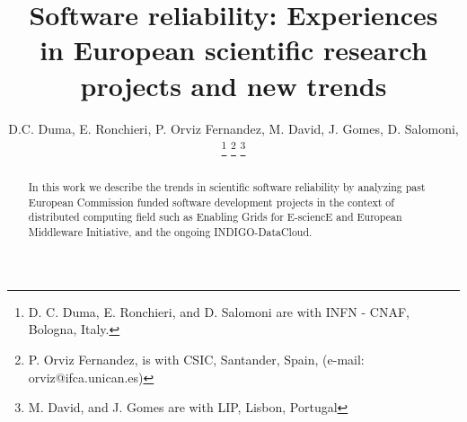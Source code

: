 \documentclass[journal]{IEEEtran}
\begin{document}
\title{Software reliability: Experiences\\
in European scientific research\\
projects and new trends}
%
%

\author{D.C. Duma, %
        E. Ronchieri, %
        P. Orviz Fernandez, %
        M. David, %
        J. Gomes, %
        D. Salomoni, %
\thanks{D. C. Duma, E. Ronchieri, and D. Salomoni are with INFN - CNAF, Bologna, Italy.}%
\thanks{P. Orviz Fernandez, is with CSIC, Santander, Spain, (e-mail: orviz@ifca.unican.es)}%
\thanks{M. David, and J. Gomes are with LIP, Lisbon, Portugal}%
}

\maketitle
\pagestyle{empty}
\thispagestyle{empty}

\begin{abstract}
In this work we describe the trends in scientific software reliability by analyzing past European Commission funded software development projects in the context of distributed computing field such as Enabling Grids for E-sciencE and European Middleware Initiative, and the ongoing INDIGO-DataCloud.
\end{abstract}

\end{document}
